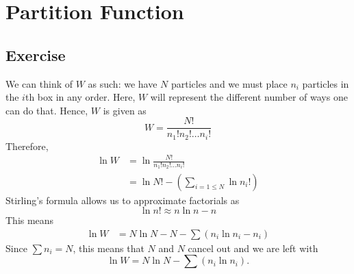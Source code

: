 \section{Partition Function}
\subsection{Exercise}
We can think of $W$ as such: we have $N$ particles and we must place $n_i$ particles in the $i$th box in any order. Here, $W$ will represent the different number of ways one can do that. Hence, $W$ is given as 
\begin{equation}
    W = \frac{N!}{n_1!n_2!\dots n_i!}
\end{equation}
Therefore, 
\begin{align}
    \ln W &= \ln \frac{N!}{n_1!n_2!\dots n_i!} \\
    &= \ln N! - \left(\sum_{i=1\leq N} \ln n_i!\right)
\end{align}
Stirling's formula allows us to approximate factorials as 
\begin{equation}
    \ln n! \approx n\ln n - n
\end{equation}
This means 
\begin{align}
    \ln W &= N\ln N - N - \sum \left(n_i\ln n_i - n_i\right)
\end{align}
Since $\sum n_i = N$, this means that $N$ and $N$ cancel out and we are left with 
\begin{equation}
    \ln W = N \ln N - \sum (n_i \ln n_i).
\end{equation}
